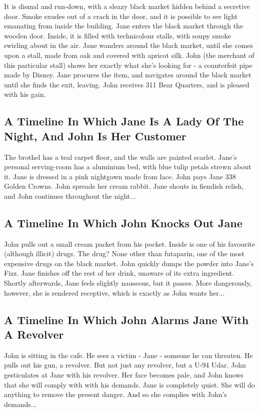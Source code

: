 \documentclass{article}
\begin{document}
It is dismal and run{-}down, with a sleazy black market hidden behind a secretive door.
Smoke exudes out of a crack in the door, and it is possible to see light emanating from inside the building.
Jane enters the black market through the wooden door.
Inside, it is filled with technicolour stalls, with soupy smoke swirling about in the air.
Jane wanders around the black market, until she comes upon a stall, made from oak and covered with apricot silk.
John (the merchant of this particular stall) shows her exactly what she's looking for {-} a counterfeit pipe made by Disney.
Jane procures the item, and navigates around the black market until she finds the exit, leaving.
John receives 311 Bear Quarters, and is pleased with his gain.
\subsection{A Timeline In Which Jane Is A Lady Of The Night, And John Is Her Customer}


The brothel has a teal carpet floor, and the walls are painted scarlet.
Jane's personal serving{-}room has a aluminium bed, with blue tulip petals strewn about it.
Jane is dressed in a pink nightgown made from lace.
John pays Jane 338 Golden Crowns.
John spreads her cream rabbit.
Jane shouts in fiendish relish, and John continues throughout the night...
\subsection{A Timeline In Which John Knocks Out Jane}


John pulls out a small cream packet from his pocket. Inside is one of his favourite (although illicit) drugs.
The drug? None other than futaparin, one of the most expensive drugs on the black market.
John quickly dumps the powder into Jane's Fizz.
Jane finishes off the rest of her drink, unaware of its extra ingredient.
Shortly afterwards, Jane feels slightly nauseous, but it passes.
More dangerously, however, she is rendered receptive, which is exactly as John wants her...
\subsection{A Timeline In Which John Alarms Jane With A Revolver}


John is sitting in the cafe.
He sees a victim {-} Jane {-} someone he can threaten. He pulls out his gun, a revolver.
But not just any revolver, but a U{-}94 Udar.
John gesticulates at Jane with his revolver. Her face becomes pale, and John knows that she will comply with with his demands.
Jane is completely quiet. She will do anything to remove the present danger. And so she complies with John's demands...
\end{document}
